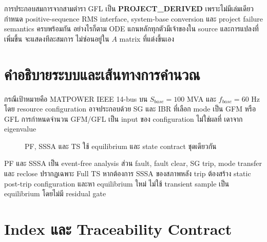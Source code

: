 \documentclass[12pt,a4paper]{article}
\newcommand{\derived}{\textcolor{teal!70!black}{\textbf{PROJECT\_DERIVED}}}
\begin{document}
การประกอบสมการจากสามตำรา GFL เป็น \derived{} เพราะไม่มีเล่มเดียวกำหนด
positive-sequence RMS interface, system-base conversion และ project failure semantics
ครบพร้อมกัน อย่างไรก็ตาม ODE แกนหลักทุกตัวมีเจ้าของใน source และการแปลงที่เพิ่มขึ้น
จะแสดงทีละสมการ ไม่ซ่อนอยู่ใน $A$ matrix ที่แต่งขึ้นเอง

\section{คำอธิบายระบบและเส้นทางการคำนวณ}

กรณีเป้าหมายคือ MATPOWER IEEE 14-bus บน $S_{base}=100$ MVA และ
$f_{base}=60$ Hz โดย resource configuration อาจประกอบด้วย SG และ IBR ที่เลือก mode
เป็น GFM หรือ GFL การกำหนดจำนวน GFM/GFL เป็น input ของ configuration ไม่ใช่ผลที่
เดาจาก eigenvalue

\begin{figure}[H]\centering
{}
\caption{PF, SSSA และ TS ใช้ equilibrium และ state contract ชุดเดียวกัน}
\end{figure}

PF และ SSSA เป็น event-free analysis ส่วน fault, fault clear, SG trip, mode transfer
และ reclose ปรากฏเฉพาะ Full TS หากต้องการ SSSA ของสภาพหลัง trip ต้องสร้าง static
post-trip configuration และหา equilibrium ใหม่ ไม่ใช้ transient sample เป็น equilibrium
โดยไม่มี residual gate

\section{Index และ Traceability Contract}
\end{document}
